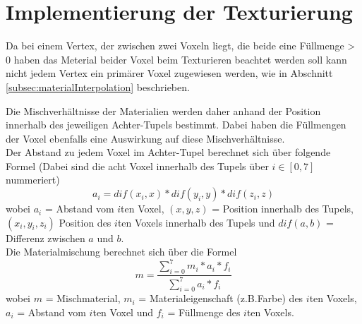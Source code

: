 
\section{Implementierung der  Texturierung}
\label{sec:implementierungTexturierung}
Da bei einem Vertex, der zwischen zwei Voxeln liegt, die beide eine Füllmenge > 0 haben das Meterial beider Voxel beim Texturieren beachtet werden soll kann nicht jedem Vertex ein primärer Voxel zugewiesen werden, wie in Abschnitt \ref{subsec:materialInterpolation} beschrieben.

Die Mischverhältnisse der Materialien werden daher anhand der Position innerhalb des jeweiligen Achter-Tupels bestimmt. Dabei haben die Füllmengen der Voxel ebenfalls eine Auswirkung auf diese Mischverhältnisse.
\\

Der Abstand zu jedem Voxel im Achter-Tupel berechnet sich über folgende Formel (Dabei sind die acht Voxel innerhalb des Tupels über $i \in [0,7]$ nummeriert)
\[a_i= dif(x_i,x)*dif(y_i,y)*dif(z_i,z)\]
wobei $a_i$ = Abstand vom $i$ten Voxel, $(x,y,z)$ = Position innerhalb des Tupels, $(x_i,y_i,z_i)$ Position des $i$ten Voxels innerhalb des Tupels und $dif(a,b)$ = Differenz zwischen $a$ und $b$.
\\

Die Materialmischung berechnet sich über die Formel
\[m = \frac{\sum\limits_{i=0}^{7}m_i*a_i*f_i}{\sum\limits_{i=0}^{7}a_i*f_i}\]
wobei $m$ = Mischmaterial, $m_i$ = Materialeigenschaft (z.B.Farbe)  des $i$ten Voxels, $a_i$ = Abstand vom $i$ten Voxel und $f_i$ = Füllmenge des $i$ten Voxels.